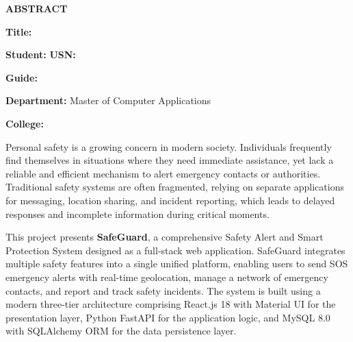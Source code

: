 \thispagestyle{plain}
\begin{center}
  \vspace*{1cm}
  {\LARGE \textbf{ABSTRACT}}\\[2cm]
\end{center}

\begin{center}
  \begin{minipage}{0.85\textwidth}
    \large

    \noindent\textbf{Title:} \projectTitle

    \vspace{0.3cm}
    \noindent\textbf{Student:} \studentName \hfill \textbf{USN:} \usnNumber

    \vspace{0.3cm}
    \noindent\textbf{Guide:} \guideName

    \vspace{0.3cm}
    \noindent\textbf{Department:} Master of Computer Applications

    \vspace{0.3cm}
    \noindent\textbf{College:} \collegeName

    \vspace{1cm}

    \noindent Personal safety is a growing concern in modern society. Individuals frequently find themselves in situations where they need immediate assistance, yet lack a reliable and efficient mechanism to alert emergency contacts or authorities. Traditional safety systems are often fragmented, relying on separate applications for messaging, location sharing, and incident reporting, which leads to delayed responses and incomplete information during critical moments.

    \vspace{0.5cm}

    \noindent This project presents \textbf{SafeGuard}, a comprehensive Safety Alert and Smart Protection System designed as a full-stack web application. SafeGuard integrates multiple safety features into a single unified platform, enabling users to send SOS emergency alerts with real-time geolocation, manage a network of emergency contacts, and report and track safety incidents. The system is built using a modern three-tier architecture comprising React.js 18 with Material UI for the presentation layer, Python FastAPI for the application logic, and MySQL 8.0 with SQLAlchemy ORM for the data persistence layer.


\end{minipage}
\end{center}
